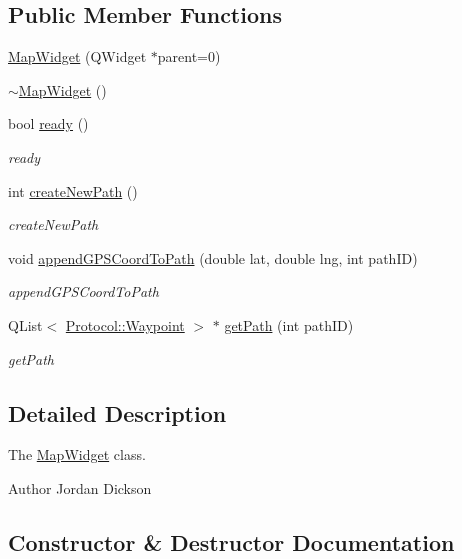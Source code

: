 \subsection*{Public Member Functions}
\begin{DoxyCompactItemize}
\item 
\hyperlink{class_map_widget_a713e505662adb701530212e7a2d78362}{Map\+Widget} (Q\+Widget $\ast$parent=0)
\item 
\hyperlink{class_map_widget_a2be5ffdc125d85aa0ccdb4f552e393cc}{$\sim$\+Map\+Widget} ()
\item 
bool \hyperlink{class_map_widget_ab74d0f96d17ac84330c1ad9128fa3043}{ready} ()
\begin{DoxyCompactList}\small\item\em ready \end{DoxyCompactList}\item 
int \hyperlink{class_map_widget_a74413ad372d073726adaafa0e4b23a88}{create\+New\+Path} ()
\begin{DoxyCompactList}\small\item\em create\+New\+Path \end{DoxyCompactList}\item 
void \hyperlink{class_map_widget_a4ce8b29f199770cbbfb619409d03b64a}{append\+G\+P\+S\+Coord\+To\+Path} (double lat, double lng, int path\+I\+D)
\begin{DoxyCompactList}\small\item\em append\+G\+P\+S\+Coord\+To\+Path \end{DoxyCompactList}\item 
Q\+List$<$ \hyperlink{struct_protocol_1_1_waypoint}{Protocol\+::\+Waypoint} $>$ $\ast$ \hyperlink{class_map_widget_ade38deed1067391a63e190a129de6503}{get\+Path} (int path\+I\+D)
\begin{DoxyCompactList}\small\item\em get\+Path \end{DoxyCompactList}\end{DoxyCompactItemize}


\subsection{Detailed Description}
The \hyperlink{class_map_widget}{Map\+Widget} class. 

\begin{DoxyAuthor}{Author}
Jordan Dickson 
\end{DoxyAuthor}


\subsection{Constructor \& Destructor Documentation}
\hypertarget{class_map_widget_a713e505662adb701530212e7a2d78362}{}
